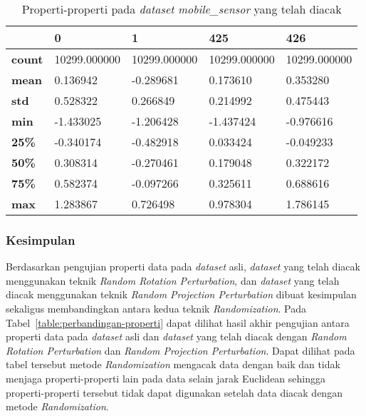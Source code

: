 \begin{table}
	\centering
	\caption{Properti-properti pada \textit{dataset} \textit{mobile\_sensor} yang telah diacak}
	\begin{tabular}{l|llll}
		\hline
		& 0 & 1 & 425 & 426 \\ \hline
		\textbf{count} & 10299.000000 & 10299.000000 & 10299.000000 & 10299.000000 \\
		\textbf{mean} & 0.136942 & -0.289681 & 0.173610 & 0.353280 \\
		\textbf{std} & 0.528322 & 0.266849 & 0.214992 & 0.475443 \\
		\textbf{min} & -1.433025 & -1.206428 & -1.437424 & -0.976616 \\
		\textbf{25\%} & -0.340174 & -0.482918 & 0.033424 & -0.049233 \\
		\textbf{50\%} & 0.308314 & -0.270461 & 0.179048 & 0.322172 \\
		\textbf{75\%} & 0.582374 & -0.097266 & 0.325611 & 0.688616 \\
		\textbf{max} & 1.283867 & 0.726498 & 0.978304 & 1.786145 \\
		\hline
	\end{tabular}
	\label{table:properti-mobile-sensor-randomisasi}
\end{table}

\subsubsection{Kesimpulan}
\label{subsubsec:pengujian-properti-kesimpulan}

Berdasarkan pengujian properti data pada \textit{dataset} asli, \textit{dataset} yang telah diacak menggunakan teknik \textit{Random Rotation Perturbation}, dan \textit{dataset} yang telah diacak menggunakan teknik \textit{Random Projection Perturbation} dibuat kesimpulan sekaligus membandingkan antara kedua teknik \textit{Randomization}. Pada Tabel~\ref{table:perbandingan-properti} dapat dilihat hasil akhir pengujian antara properti data pada \textit{dataset} asli dan \textit{dataset} yang telah diacak dengan \textit{Random Rotation Perturbation} dan \textit{Random Projection Perturbation}. Dapat dilihat pada tabel tersebut metode \textit{Randomization} mengacak data dengan baik dan tidak menjaga properti-properti lain pada data selain jarak Euclidean sehingga properti-properti tersebut tidak dapat digunakan setelah data diacak dengan metode \textit{Randomization}.

